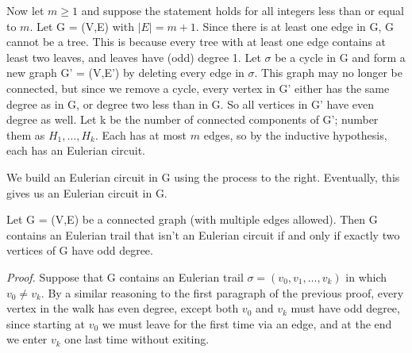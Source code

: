 \documentclass{tufte-handout}
\begin{document}
Now let \( m \geq 1 \) and suppose the statement holds for all integers less than or equal to \( m \).
Let G = (V,E) with \(\left|E\right| = m +1 \). Since there is at least one edge in G,
G cannot be a tree. This is because every tree with at least one edge contains at least two leaves,
and leaves have (odd) degree 1. Let \(\sigma\) be a cycle in G
and form a new graph G' = (V,E') by deleting every edge in \(\sigma\). This graph
may no longer be connected, but since we remove a cycle, every vertex in G' either has the
same degree as in G, or degree two less than in G. So all vertices in G' have even degree as well.
Let k be the number of connected components of G'; number them as \( H_1, \ldots, H_k \).
Each has at most \( m \) edges, so by the inductive hypothesis, each has an Eulerian circuit.

We build an Eulerian circuit in G using the process to the right.
Eventually, this gives us an Eulerian circuit in G. \qedsymbol

\begin{Theorem}
    Let G = (V,E) be a connected graph (with multiple edges allowed). Then G contains an Eulerian trail
    that isn't an Eulerian circuit if and only if exactly two vertices of G have odd degree.
\end{Theorem}

\textit{Proof.} Suppose that G contains an Eulerian trail \( \sigma = (v_0, v_1, \ldots, v_k) \) in which \( v_0 \neq v_k \).
By a similar reasoning to the first paragraph of the previous proof, every vertex in the walk has even degree, except both \( v_0 \) and \( v_k \)
must have odd degree, since starting at \( v_0 \) we must leave for the first time via an edge, and at the end we enter
\( v_k \) one last time without exiting.
\end{document}
